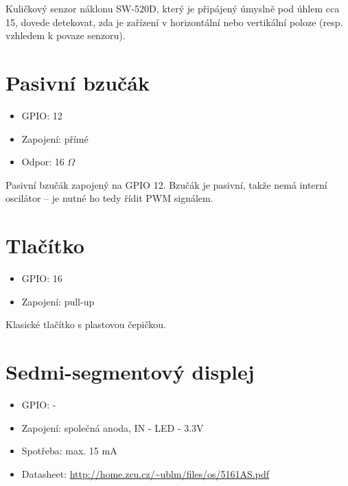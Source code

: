 \documentclass{article}
\newcommand\lang[2]{#1}
\begin{document}
\lang{Kuličkový senzor náklonu SW-520D, který je připájený úmyslně pod úhlem cca 15\degree, dovede detekovat, zda je zařízení v horizontální nebo vertikální poloze (resp. \uv{půl-poloze} vzhledem k povaze senzoru).}
{Ball tilt sensor SW-520D, which is soldered to the expansion board under 15\degree angle. This sensor is able to sense, if the device is in horizontal or vertical position (or \uv{half-position} due to the sensor type).}

\section{\lang{Pasivní bzučák}{Passive buzzer}}

\begin{itemize}
	\item GPIO: 12
	\item \lang{Zapojení: přímé}{Wiring: direct}
	\item \lang{Odpor}{Resistance}: 16 $\Omega$
\end{itemize}

\lang{Pasivní bzučák zapojený na GPIO 12. Bzučák je pasivní, takže nemá interní oscilátor -- je nutné ho tedy řídit PWM signálem.}{Passive buzzer connected to GPIO 12. The buzzer is passive, so it does not have the internal oscilator -- the pulse-width modulation (PWM) is needed to drive the buzzer.}

\section{\lang{Tlačítko}{Push button}}

\begin{itemize}
	\item GPIO: 16
	\item \lang{Zapojení: pull-up}{Wiring: pull-up}
\end{itemize}

\lang{Klasické tlačítko s plastovou čepičkou.}{Standard push button with plastic cap.}

\section{\lang{Sedmi-segmentový displej}{7-segment display}}

\begin{itemize}
	\item GPIO: -
	\item \lang{Zapojení: společná anoda}{Wiring: common anode}, IN - LED - 3.3V
	\item \lang{Spotřeba}{Current}: max. 15 mA
	\item Datasheet: \url{http://home.zcu.cz/~ublm/files/os/5161AS.pdf}
\end{itemize}
\end{document}
